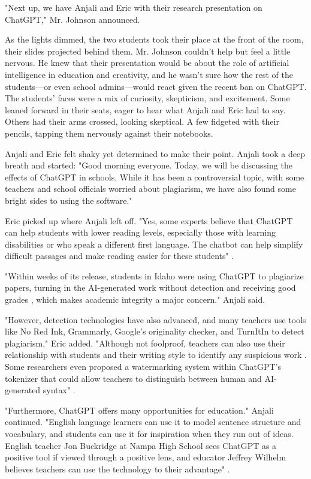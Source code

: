 \documentclass[stu]{apa7}
\begin{document}
"Next up, we have Anjali and Eric with their research presentation on ChatGPT," Mr. Johnson announced.

As the lights dimmed, the two students took their place at the front of the room, their slides projected behind them. Mr. Johnson couldn't help but feel a little nervous. He knew that their presentation would be about the role of artificial intelligence in education and creativity, and he wasn't sure how the rest of the students---or even school admins---would react given the recent ban on ChatGPT. The students' faces were a mix of curiosity, skepticism, and excitement. Some leaned forward in their seats, eager to hear what Anjali and Eric had to say. Others had their arms crossed, looking skeptical. A few fidgeted with their pencils, tapping them nervously against their notebooks.

Anjali and Eric felt shaky yet determined to make their point. Anjali took a deep breath and started: "Good morning everyone. Today, we will be discussing the effects of ChatGPT in schools. While it has been a controversial topic, with some teachers and school officials worried about plagiarism, we have also found some bright sides to using the software."

Eric picked up where Anjali left off. "Yes, some experts believe that ChatGPT can help students with lower reading levels, especially those with learning disabilities or who speak a different first language. The chatbot can help simplify difficult passages and make reading easier for these students" \autocite{johnson2023}.

"Within weeks of its release, students in Idaho were using ChatGPT to plagiarize papers, turning in the AI-generated work without detection and receiving good grades \autocite{vice2023}, which makes academic integrity a major concern." Anjali said.

"However, detection technologies have also advanced, and many teachers use tools like No Red Ink, Grammarly, Google’s originality checker, and TurnItIn to detect plagiarism," Eric added. "Although not foolproof, teachers can also use their relationship with students and their writing style to identify any suspicious work \autocite{idaho2022}. Some researchers even proposed a watermarking system within ChatGPT's tokenizer that could allow teachers to distinguish between human and AI-generated syntax" \autocite{watermark2023}.

"Furthermore, ChatGPT offers many opportunities for education." Anjali continued. "English language learners can use it to model sentence structure and vocabulary, and students can use it for inspiration when they run out of ideas. English teacher Jon Buckridge at Nampa High School sees ChatGPT as a positive tool if viewed through a positive lens, and educator Jeffrey Wilhelm believes teachers can use the technology to their advantage" \autocite{roose2023}.
\end{document}
